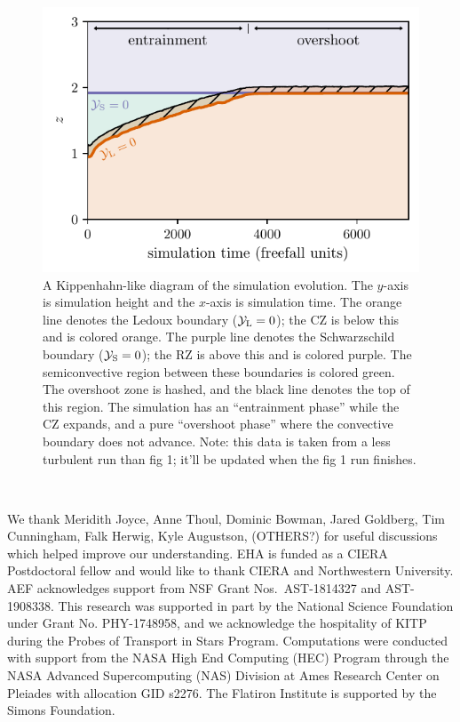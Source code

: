 \documentclass[twocolumn, linenumbers, twocolappendix]{aastex631}
\newcommand{\yL}{\ensuremath{\mathcal{Y}_{\rm{L}}}}
\newcommand{\yS}{\ensuremath{\mathcal{Y}_{\rm{S}}}}
\begin{document}
\begin{figure}[t!]
\centering
\includegraphics[width=\columnwidth]{kippenhahn.pdf}
\caption{
    A Kippenhahn-like diagram of the simulation evolution.
    The $y$-axis is simulation height and the $x$-axis is simulation time.
    The orange line denotes the Ledoux boundary ($\yL = 0$); the CZ is below this and is colored orange.
    The purple line denotes the Schwarzschild boundary ($\yS = 0$); the RZ is above this and is colored purple.
    The semiconvective region between these boundaries is colored green.
    The overshoot zone is hashed, and the black line denotes the top of this region.
    The simulation has an ``entrainment phase'' while the CZ expands, and a pure ``overshoot phase'' where the convective boundary does not advance.
    {\color{blue} Note: this data is taken from a less turbulent run than fig 1; it'll be updated when the fig 1 run finishes.}
\label{fig:kippenhahn}
}
\end{figure}


\newpage
\,\newpage


\begin{acknowledgments}
We thank Meridith Joyce, Anne Thoul, Dominic Bowman, Jared Goldberg, Tim Cunningham, Falk Herwig, Kyle Augustson, (OTHERS?) for useful discussions which helped improve our understanding.
EHA is funded as a CIERA Postdoctoral fellow and would like to thank CIERA and Northwestern University. 
AEF acknowledges support from NSF Grant Nos.~AST-1814327 and AST-1908338. 
This research was supported in part by the National Science Foundation under Grant No. PHY-1748958, and we acknowledge the hospitality of KITP during the Probes of Transport in Stars Program.
Computations were conducted with support from the NASA High End Computing (HEC) Program through the NASA Advanced Supercomputing (NAS) Division at Ames Research Center on Pleiades with allocation GID s2276.
The Flatiron Institute is supported by the Simons Foundation.
\end{acknowledgments}


\appendix





                                                          	



\end{document}
